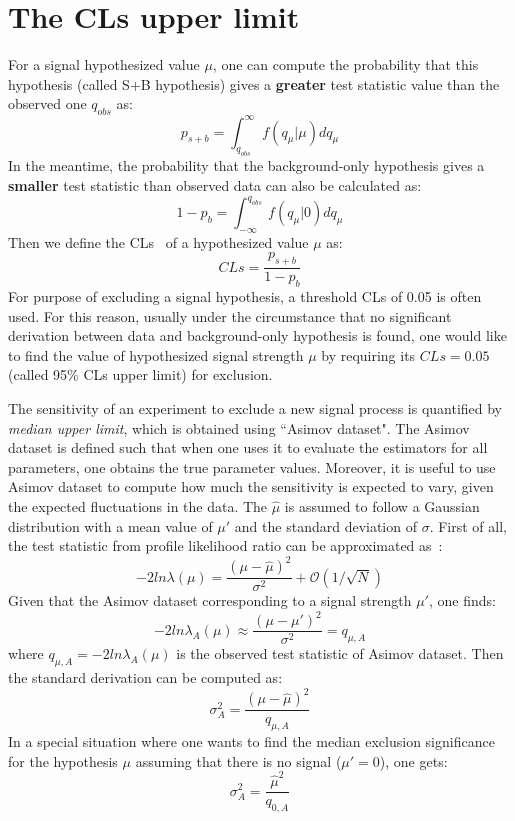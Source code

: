 \section{The CLs upper limit}

For a signal hypothesized value $\mu$, one can compute the probability that this hypothesis (called S+B hypothesis) gives a \textbf{greater} test statistic value than the observed one $q_{obs}$ as:
\begin{equation}
    p_{s+b} = \int_{q_{obs}}^{\infty} f(q_{\mu}|\mu) d q_{\mu}
\end{equation}
In the meantime, the probability that the background-only hypothesis gives a \textbf{smaller} test statistic than observed data can also be calculated as:
\begin{equation}
    1 - p_{b} = \int_{-\infty}^{q_{obs}} f(q_{\mu}|0) d q_{\mu}
\end{equation}
Then we define the CLs~\cite{Read_2002} of a hypothesized value $\mu$ as:
\begin{equation}
    CLs = \frac{p_{s+b}}{1-p_{b}}
\end{equation}
For purpose of excluding a signal hypothesis, a threshold CLs of 0.05 is often used.
For this reason, usually under the circumstance that no significant derivation between data and background-only hypothesis is found,
one would like to find the value of hypothesized signal strength $\mu$ by requiring its $CLs = 0.05$ (called 95\% CLs upper limit) for exclusion. 

The sensitivity of an experiment to exclude a new signal process is quantified by \textit{median upper limit},
which is obtained using ``Asimov dataset".
The Asimov dataset is defined such that when one uses it to evaluate the estimators for all parameters, one obtains the true parameter values.
Moreover, it is useful to use Asimov dataset to compute how much the sensitivity is expected to vary, given the expected fluctuations in the data.
The $\hat{\mu}$ is assumed to follow a Gaussian distribution with a mean value of $\mu '$ and the standard deviation of $\sigma$.
First of all, the test statistic from profile likelihood ratio can be approximated as~\cite{Cowan:2010js}:
\begin{equation}
	-2 ln \lambda(\mu) = \frac{(\mu - \hat{\mu})^2}{\sigma^2} + \mathcal{O}(1/\sqrt{N})
\end{equation}
Given that the Asimov dataset corresponding to a signal strength $\mu'$, one finds:
\begin{equation}
	-2 ln \lambda_{A}(\mu) \approx \frac{(\mu - \mu')^2}{\sigma^2} = q_{\mu,A}
\end{equation}
where $q_{\mu,A} = -2ln\lambda_{A}(\mu)$ is the observed test statistic of Asimov dataset.
Then the standard derivation can be computed as:
\begin{equation}
	\sigma_A^2 = \frac{(\mu - \hat{\mu})^2}{q_{\mu,A}}
\end{equation}
In a special situation where one wants to find the median exclusion significance for the hypothesis $\mu$ assuming that there is no signal ($\mu' = 0$),
one gets:
\begin{equation}
        \sigma_A^2 = \frac{\hat{\mu}^2}{q_{0,A}}
\end{equation}
